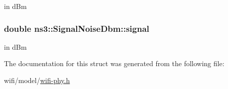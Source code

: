 in d\+Bm 

\subsubsection[{\texorpdfstring{signal}{signal}}]{\setlength{\rightskip}{0pt plus 5cm}double ns3\+::\+Signal\+Noise\+Dbm\+::signal}\hypertarget{structns3_1_1SignalNoiseDbm_ab40070893b526511063eee33602eb442}{}\label{structns3_1_1SignalNoiseDbm_ab40070893b526511063eee33602eb442}


in d\+Bm 



The documentation for this struct was generated from the following file\+:\begin{DoxyCompactItemize}
\item 
wifi/model/\hyperlink{wifi-phy_8h}{wifi-\/phy.\+h}\end{DoxyCompactItemize}
